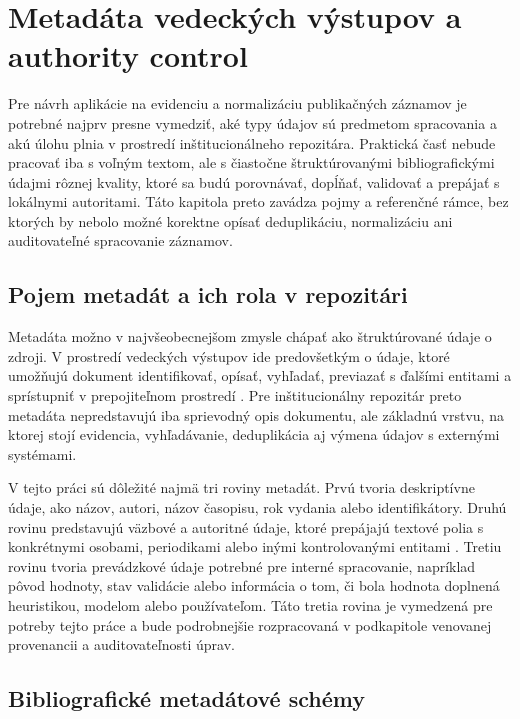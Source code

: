 

\section{Metadáta vedeckých výstupov a authority control}

Pre návrh aplikácie na evidenciu a normalizáciu publikačných záznamov je potrebné najprv presne vymedziť, aké typy údajov sú predmetom spracovania a akú úlohu plnia v prostredí inštitucionálneho repozitára. Praktická časť nebude pracovať iba s voľným textom, ale s čiastočne štruktúrovanými bibliografickými údajmi rôznej kvality, ktoré sa budú porovnávať, dopĺňať, validovať a prepájať s lokálnymi autoritami. Táto kapitola preto zavádza pojmy a referenčné rámce, bez ktorých by nebolo možné korektne opísať deduplikáciu, normalizáciu ani auditovateľné spracovanie záznamov.

\subsection{Pojem metadát a ich rola v repozitári}

Metadáta možno v najvšeobecnejšom zmysle chápať ako štruktúrované údaje o zdroji. V prostredí vedeckých výstupov ide predovšetkým o údaje, ktoré umožňujú dokument identifikovať, opísať, vyhľadať, previazať s ďalšími entitami a sprístupniť v prepojiteľnom prostredí \cite{DCMITerms}. Pre inštitucionálny repozitár preto metadáta nepredstavujú iba sprievodný opis dokumentu, ale základnú vrstvu, na ktorej stojí evidencia, vyhľadávanie, deduplikácia aj výmena údajov s externými systémami.

V tejto práci sú dôležité najmä tri roviny metadát. Prvú tvoria deskriptívne údaje, ako názov, autori, názov časopisu, rok vydania alebo identifikátory. Druhú rovinu predstavujú väzbové a autoritné údaje, ktoré prepájajú textové polia s konkrétnymi osobami, periodikami alebo inými kontrolovanými entitami \cite{DCMITerms}. Tretiu rovinu tvoria prevádzkové údaje potrebné pre interné spracovanie, napríklad pôvod hodnoty, stav validácie alebo informácia o tom, či bola hodnota doplnená heuristikou, modelom alebo používateľom. Táto tretia rovina je vymedzená pre potreby tejto práce a bude podrobnejšie rozpracovaná v podkapitole venovanej provenancii a auditovateľnosti úprav.

\subsection{Bibliografické metadátové schémy}

